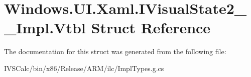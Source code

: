 \hypertarget{struct_windows_1_1_u_i_1_1_xaml_1_1_i_visual_state2_____impl_1_1_vtbl}{}\section{Windows.\+U\+I.\+Xaml.\+I\+Visual\+State2\+\_\+\+\_\+\+Impl.\+Vtbl Struct Reference}
\label{struct_windows_1_1_u_i_1_1_xaml_1_1_i_visual_state2_____impl_1_1_vtbl}


The documentation for this struct was generated from the following file\+:\begin{DoxyCompactItemize}
\item 
I\+V\+S\+Calc/bin/x86/\+Release/\+A\+R\+M/ilc/Impl\+Types.\+g.\+cs\end{DoxyCompactItemize}
